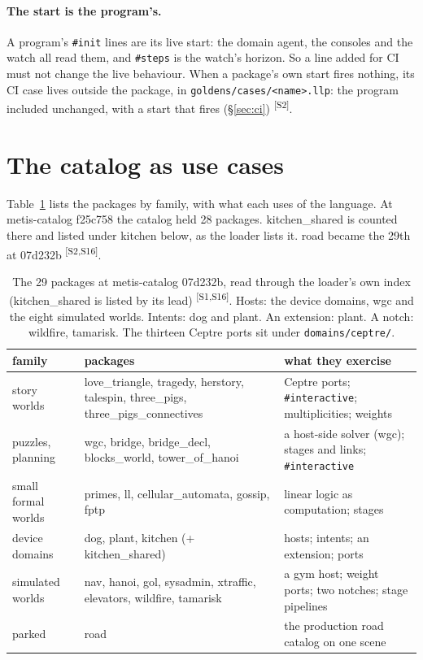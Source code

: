 \documentclass[11pt]{article}
\newcommand{\src}[1]{\textsuperscript{[#1]}}
\begin{document}
\paragraph{The start is the program's.} A program's \texttt{\#init} lines
are its live start: the domain agent, the consoles and the watch all read
them, and \texttt{\#steps} is the watch's horizon. So a line added for CI
must not change the live behaviour. When a package's own start fires
nothing, its CI case lives outside the package, in
\texttt{goldens/cases/<name>.llp}: the program included unchanged, with a
start that fires (\S\ref{sec:ci}) \src{S2}.

\section{The catalog as use cases}\label{sec:cases}

Table~\ref{tab:packages} lists the packages by family, with what each
uses of the language. At metis-catalog f25c758 the catalog held 28
packages. kitchen\_shared is counted there and listed under kitchen
below, as the loader lists it. road became the 29th at 07d232b
\src{S2,S16}.

\begin{table}[t]
\small
\begin{tabularx}{\textwidth}{@{}l>{\raggedright}X>{\raggedright\arraybackslash}X@{}}
\toprule
family & packages & what they exercise \\
\midrule
story worlds & love\_triangle, tragedy, herstory, talespin, three\_pigs,
  three\_pigs\_connectives & Ceptre ports; \texttt{\#interactive};
  multiplicities; weights \\
puzzles, planning & wgc, bridge, bridge\_decl, blocks\_world,
  tower\_of\_hanoi & a host-side solver (wgc); stages and links;
  \texttt{\#interactive} \\
small formal worlds & primes, ll, cellular\_automata, gossip, fptp &
  linear logic as computation; stages \\
device domains & dog, plant, kitchen (+ kitchen\_shared) & hosts;
  intents; an extension; ports \\
simulated worlds & nav, hanoi, gol, sysadmin, xtraffic, elevators,
  wildfire, tamarisk & a gym host; weight ports; two notches; stage
  pipelines \\
parked & road & the production road catalog on one scene \\
\bottomrule
\end{tabularx}
\caption{The 29 packages at metis-catalog 07d232b, read through the
loader's own index (kitchen\_shared is listed by its lead) \src{S1,S16}.
Hosts: the device domains, wgc and the eight simulated worlds. Intents:
dog and plant. An extension: plant. A notch: wildfire, tamarisk. The
thirteen Ceptre ports sit under \texttt{domains/ceptre/}.}
\label{tab:packages}
\end{table}
\end{document}
